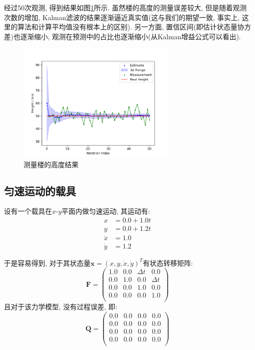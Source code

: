 \documentclass[12pt]{article}
\begin{document}
经过50次观测, 得到结果如图\ref{fig:exp1}所示. 虽然楼的高度的测量误差较大, 但是随着观测次数的增加, Kalman滤波的结果逐渐逼近真实值(这与我们的期望一致, 事实上, 这里的算法和计算平均值没有根本上的区别). 另一方面, 置信区间(即估计状态量协方差)也逐渐缩小, 观测在预测中的占比也逐渐缩小(从Kalman增益公式可以看出).
\begin{figure}[htbp] %
   \centering
   \includegraphics[width=0.7\textwidth]{./figures/exp1} 
   \caption{测量楼的高度结果}
   \label{fig:exp1}
\end{figure}

\subsection{匀速运动的载具}

设有一个载具在$x$-$y$平面内做匀速运动, 其运动有:
\begin{equation*}
\begin{aligned}
x &= 0.0 + 1.0 t \\
y & = 0.0 + 1.2 t \\
\dot{x} &= 1.0 \\
\dot{y} &= 1.2
\end{aligned}
\end{equation*}

于是容易得到, 对于其状态量$\bm{x} = (x, y, \dot{x}, \dot{y})^T$有状态转移矩阵:
\begin{equation*}
\bm{F} =    
   \begin{pmatrix} %
      1.0 & 0.0 & \Delta t & 0.0\\
      0.0 & 1.0 & 0.0 & \Delta t \\
      0.0 & 0.0 & 1.0 & 0.0 \\
      0.0 & 0.0 & 0.0 & 1.0 \\
   \end{pmatrix}
\end{equation*}
且对于该力学模型, 没有过程误差, 即:
\begin{equation*}
\bm{Q} =    
   \begin{pmatrix} %
      0.0 & 0.0 & 0.0 & 0.0\\
      0.0 & 0.0 & 0.0 & 0.0 \\
      0.0 & 0.0 & 0.0 & 0.0 \\
      0.0 & 0.0 & 0.0 & 0.0 \\
   \end{pmatrix}
\end{equation*}
\end{document}
